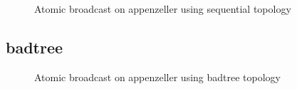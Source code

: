 \begin{figure}[ht!]

\caption{Atomic broadcast on appenzeller using sequential topology}
\label{fig:ab_appenzeller_sequential}
\end{figure}
\clearpage\subsection{badtree}

\begin{figure}[ht!]

\caption{Atomic broadcast on appenzeller using badtree topology}
\label{fig:ab_appenzeller_badtree}
\end{figure}
\clearpage